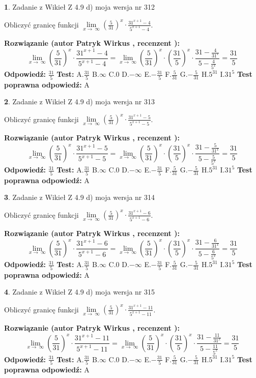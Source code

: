 \documentclass[12pt, a4paper]{article}
\theoremstyle{definition} %
\newtheorem{zad}{}
\newcommand{\zadStart}[1]{\begin{zad}#1\newline}
\newcommand{\zadStop}{\end{zad}}
\newcommand{\rozwStart}[2]{\noindent \textbf{Rozwiązanie (autor #1 , recenzent #2): }\newline}
\newcommand{\rozwStop}{\newline}
\newcommand{\odpStart}{\noindent \textbf{Odpowiedź:}\newline}
\newcommand{\odpStop}{\newline}
\newcommand{\testStart}{\noindent \textbf{Test:}\newline}
\newcommand{\testStop}{\newline}
\newcommand{\kluczStart}{\noindent \textbf{Test poprawna odpowiedź:}\newline}
\newcommand{\kluczStop}{\newline}
\begin{document}
\zadStart{Zadanie z Wikieł Z 4.9 d) moja wersja nr 312}


Obliczyć granicę funkcji  $\lim\limits_{x\to\ \infty}(\frac{5}{31})^{x}\cdot\frac{31^{x+1}-4}{5^{x+1}-4}$.
\zadStop
\rozwStart{Patryk Wirkus}{}
$$\lim\limits_{x\to\ \infty}(\frac{5}{31})^{x}\cdot\frac{31^{x+1}-4}{5^{x+1}-4}=\lim\limits_{x\to\ \infty}(\frac{5}{31})^{x}\cdot(\frac{31}{5})^{x} \cdot \frac{31-\frac{4}{31^{x}}}{5-\frac{4}{5^{x}}} = \frac{31}{5}$$
\rozwStop
\odpStart
$\frac{31}{5}$
\odpStop
\testStart
A.$\frac{31}{5}$ B.$\infty$ C.$0$ D.$-\infty$ E.$-\frac{31}{5}$
F.$\frac{5}{31}$ G.$-\frac{5}{31}$
H.$5^{31}$
I.$31^{5}$
\testStop
\kluczStart
A
\kluczStop



\zadStart{Zadanie z Wikieł Z 4.9 d) moja wersja nr 313}


Obliczyć granicę funkcji  $\lim\limits_{x\to\ \infty}(\frac{5}{31})^{x}\cdot\frac{31^{x+1}-5}{5^{x+1}-5}$.
\zadStop
\rozwStart{Patryk Wirkus}{}
$$\lim\limits_{x\to\ \infty}(\frac{5}{31})^{x}\cdot\frac{31^{x+1}-5}{5^{x+1}-5}=\lim\limits_{x\to\ \infty}(\frac{5}{31})^{x}\cdot(\frac{31}{5})^{x} \cdot \frac{31-\frac{5}{31^{x}}}{5-\frac{5}{5^{x}}} = \frac{31}{5}$$
\rozwStop
\odpStart
$\frac{31}{5}$
\odpStop
\testStart
A.$\frac{31}{5}$ B.$\infty$ C.$0$ D.$-\infty$ E.$-\frac{31}{5}$
F.$\frac{5}{31}$ G.$-\frac{5}{31}$
H.$5^{31}$
I.$31^{5}$
\testStop
\kluczStart
A
\kluczStop



\zadStart{Zadanie z Wikieł Z 4.9 d) moja wersja nr 314}


Obliczyć granicę funkcji  $\lim\limits_{x\to\ \infty}(\frac{5}{31})^{x}\cdot\frac{31^{x+1}-6}{5^{x+1}-6}$.
\zadStop
\rozwStart{Patryk Wirkus}{}
$$\lim\limits_{x\to\ \infty}(\frac{5}{31})^{x}\cdot\frac{31^{x+1}-6}{5^{x+1}-6}=\lim\limits_{x\to\ \infty}(\frac{5}{31})^{x}\cdot(\frac{31}{5})^{x} \cdot \frac{31-\frac{6}{31^{x}}}{5-\frac{6}{5^{x}}} = \frac{31}{5}$$
\rozwStop
\odpStart
$\frac{31}{5}$
\odpStop
\testStart
A.$\frac{31}{5}$ B.$\infty$ C.$0$ D.$-\infty$ E.$-\frac{31}{5}$
F.$\frac{5}{31}$ G.$-\frac{5}{31}$
H.$5^{31}$
I.$31^{5}$
\testStop
\kluczStart
A
\kluczStop



\zadStart{Zadanie z Wikieł Z 4.9 d) moja wersja nr 315}


Obliczyć granicę funkcji  $\lim\limits_{x\to\ \infty}(\frac{5}{31})^{x}\cdot\frac{31^{x+1}-11}{5^{x+1}-11}$.
\zadStop
\rozwStart{Patryk Wirkus}{}
$$\lim\limits_{x\to\ \infty}(\frac{5}{31})^{x}\cdot\frac{31^{x+1}-11}{5^{x+1}-11}=\lim\limits_{x\to\ \infty}(\frac{5}{31})^{x}\cdot(\frac{31}{5})^{x} \cdot \frac{31-\frac{11}{31^{x}}}{5-\frac{11}{5^{x}}} = \frac{31}{5}$$
\rozwStop
\odpStart
$\frac{31}{5}$
\odpStop
\testStart
A.$\frac{31}{5}$ B.$\infty$ C.$0$ D.$-\infty$ E.$-\frac{31}{5}$
F.$\frac{5}{31}$ G.$-\frac{5}{31}$
H.$5^{31}$
I.$31^{5}$
\testStop
\kluczStart
A
\kluczStop
\end{document}
